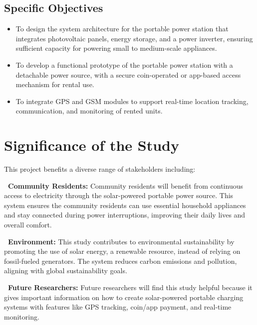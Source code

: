{\subsection{Specific Objectives}
\begin{itemize}
	\item To design the system architecture for the portable power station that integrates photovoltaic panels, energy storage, and a power inverter, ensuring sufficient capacity for powering small to medium-scale appliances.
	\item To develop a functional prototype of the portable power station with a detachable power source, with a secure coin-operated or app-based access mechanism for rental use.
	\item To integrate GPS and GSM modules to support real-time location tracking, communication, and monitoring of rented units.
\end{itemize}

\section{Significance of the Study}

This project benefits a diverse range of stakeholders including: 

\vspace{0.6em} 
\addtocounter{subsection}{1}
\noindent\textbf{\thesubsection\ Community Residents:} 
Community residents will benefit from continuous access to electricity through the solar-powered portable power source. This system ensures the community residents can use essential household appliances and stay connected during power interruptions, improving their daily lives and overall comfort.

\vspace{0.6em} 
\addtocounter{subsection}{1}
\noindent\textbf{\thesubsection\ Environment:} 
This study contributes to environmental sustainability by promoting the use of solar energy, a renewable resource, instead of relying on fossil-fueled generators. The system reduces carbon emissions and pollution, aligning with global sustainability goals.

\vspace{0.6em} 
\addtocounter{subsection}{1}
\noindent\textbf{\thesubsection\ Future Researchers:} 
Future researchers will find this study helpful because it gives important information on how to create solar-powered portable charging systems with features like GPS tracking, coin/app payment, and real-time monitoring. 

}

